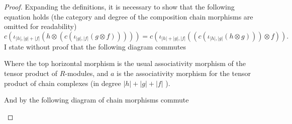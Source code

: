 \begin{proof}
    Expanding the definitions, it is necessary to show that the following equation holds (the category and degree of the composition chain morphisms are omitted for readability)
    \begin{equation}
        \label{eq:dg-composition_associative}
        c(\iota_{|h|, |g| + |f|}(h \otimes (c(\iota_{|g|, |f|}(g \otimes f))))) = c(\iota_{|h| + |g|, |f|}((c(\iota_{|h|, |g|}(h \otimes g))) \otimes f)).
    \end{equation}
    I state without proof that the following diagram commutes
    \begin{center}
    \end{center}
    Where the top horizontal morphism is the usual associativity morphism of the tensor product of \( R \)-modules, and \( a \) is the associativity morphism for the tensor product of chain complexes (in degree \( |h| + |g| + |f| \) ).

    And by \cite[Definition 6.2.1]{Borceux_1994} the following diagram of chain morphisms commute
    \begin{center}
\end{center}
\end{proof}
